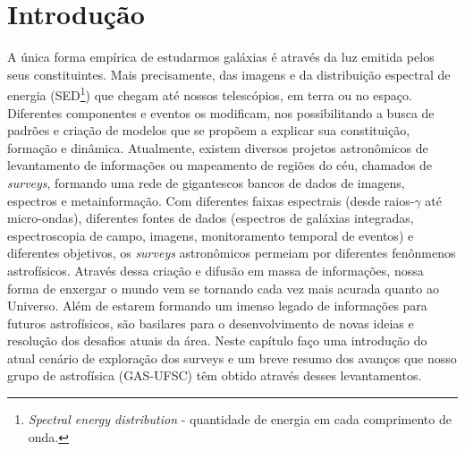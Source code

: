 



\chapter{Introdução}
\label{sec:intro}

A única forma empírica de estudarmos galáxias é através da luz emitida pelos seus constituintes. Mais precisamente, das imagens e da distribuição espectral de energia (SED\footnote{{\em Spectral energy distribution} - quantidade de energia em cada comprimento de onda.}) que chegam até nossos telescópios, em terra ou no espaço. Diferentes componentes e eventos os modificam, nos possibilitando a busca de padrões e criação de modelos que se propõem a explicar sua constituição, formação e dinâmica. Atualmente, existem diversos projetos astronômicos de levantamento de informações ou mapeamento de regiões do céu, chamados de {\em surveys}, formando uma rede de gigantescos bancos de dados de imagens, espectros e metainformação. Com diferentes faixas espectrais (desde raios-$\gamma$ até micro-ondas), diferentes fontes de dados (espectros de galáxias integradas, espectroscopia de campo, imagens, monitoramento temporal de eventos) e diferentes objetivos, os {\em surveys} astronômicos permeiam por diferentes fenônmenos astrofísicos. Através dessa criação e difusão em massa de informações, nossa forma de enxergar o mundo vem se tornando cada vez mais acurada quanto ao Universo. Além de estarem formando um imenso legado de informações para futuros astrofísicos, são basilares para o desenvolvimento de novas ideias e resolução dos desafios atuais da área. Neste capítulo faço uma introdução do atual cenário de exploração dos surveys e um breve resumo dos avanços que nosso grupo de astrofísica (GAS-UFSC) têm obtido através desses levantamentos.



